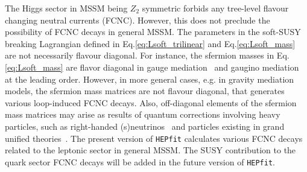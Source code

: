 \documentclass[preprint,3p,12pt]{elsarticle}
\newcommand{\HEPfit}{\texttt{HEPfit}\xspace}
\begin{document}

The Higgs sector in MSSM being $Z_2$ symmetric forbids any tree-level flavour changing neutral currents (FCNC). However, this does not preclude the possibility of FCNC decays in general MSSM. The parameters in the soft-SUSY breaking Lagrangian defined in Eq.\eqref{eq:Lsoft_trilinear} and Eq.\eqref{eq:Lsoft_mass} are not necessarily flavour diagonal. For instance, the sfermion masses in Eq.\eqref{eq:Lsoft_mass} are flavor diagonal in gauge mediation~\cite{Dine:1993yw,Dine:1994vc,Dine:1995ag} and gaugino mediation~\cite{Inoue:1991rk,Kaplan:1999ac,Chacko:1999mi} at the leading order. However, in more general cases, e.g. in gravity mediation models, the sfermion mass matrices are not flavour diagonal, that generates various loop-induced FCNC decays. Also, off-diagonal elements of the sfermion mass matrices may arise as results of quantum corrections involving heavy particles, such as right-handed (s)neutrinos~\cite{Borzumati:1986qx, Hisano:1995nq, Hisano:1995cp} and  particles existing in grand unified theories~\cite{Barbieri:1995tw, Moroi:2000mr, Barenboim:2000ev,  Moroi:2000tk}. The present version of \HEPfit calculates various FCNC decays related to the leptonic sector in general MSSM. The SUSY contribution to the quark sector FCNC decays will be added in the future version of \HEPfit.
\end{document}
